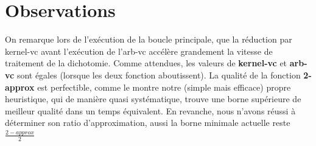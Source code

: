 \documentclass[a4paper,10pt,twoside]{report}
\begin{document}
    \section{Observations}
        On remarque lors de l'exécution de la boucle principale, que la réduction par kernel-vc avant l'exécution de l'arb-vc accélère grandement la vitesse de traitement de la dichotomie. Comme attendues, les valeurs de \textbf{kernel-vc} et \textbf{arb-vc} sont égales (lorsque les deux fonction aboutissent). La qualité de la fonction \textbf{2-approx} est perfectible, comme le montre notre (simple mais efficace) propre heuristique, qui de manière quasi systématique, trouve une borne supérieure de meilleur qualité dans un temps équivalent. En revanche, nous n'avons réussi à déterminer son ratio d'approximation, aussi la borne minimale actuelle reste $\frac{2-approx}{2}$   
\end{document}
